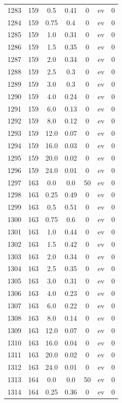 \documentclass[12pt,a4paper]{article}
\begin{document}
\begin{tabular}{r|cccccc}
	1283 & 159 & 0.5 & 0.41 & 0 & ev & 0 \\
	1284 & 159 & 0.75 & 0.4 & 0 & ev & 0 \\
	1285 & 159 & 1.0 & 0.31 & 0 & ev & 0 \\
	1286 & 159 & 1.5 & 0.35 & 0 & ev & 0 \\
	1287 & 159 & 2.0 & 0.34 & 0 & ev & 0 \\
	1288 & 159 & 2.5 & 0.3 & 0 & ev & 0 \\
	1289 & 159 & 3.0 & 0.3 & 0 & ev & 0 \\
	1290 & 159 & 4.0 & 0.24 & 0 & ev & 0 \\
	1291 & 159 & 6.0 & 0.13 & 0 & ev & 0 \\
	1292 & 159 & 8.0 & 0.12 & 0 & ev & 0 \\
	1293 & 159 & 12.0 & 0.07 & 0 & ev & 0 \\
	1294 & 159 & 16.0 & 0.03 & 0 & ev & 0 \\
	1295 & 159 & 20.0 & 0.02 & 0 & ev & 0 \\
	1296 & 159 & 24.0 & 0.01 & 0 & ev & 0 \\
	1297 & 163 & 0.0 & 0.0 & 50 & ev & 0 \\
	1298 & 163 & 0.25 & 0.49 & 0 & ev & 0 \\
	1299 & 163 & 0.5 & 0.51 & 0 & ev & 0 \\
	1300 & 163 & 0.75 & 0.6 & 0 & ev & 0 \\
	1301 & 163 & 1.0 & 0.44 & 0 & ev & 0 \\
	1302 & 163 & 1.5 & 0.42 & 0 & ev & 0 \\
	1303 & 163 & 2.0 & 0.34 & 0 & ev & 0 \\
	1304 & 163 & 2.5 & 0.35 & 0 & ev & 0 \\
	1305 & 163 & 3.0 & 0.31 & 0 & ev & 0 \\
	1306 & 163 & 4.0 & 0.23 & 0 & ev & 0 \\
	1307 & 163 & 6.0 & 0.22 & 0 & ev & 0 \\
	1308 & 163 & 8.0 & 0.14 & 0 & ev & 0 \\
	1309 & 163 & 12.0 & 0.07 & 0 & ev & 0 \\
	1310 & 163 & 16.0 & 0.04 & 0 & ev & 0 \\
	1311 & 163 & 20.0 & 0.02 & 0 & ev & 0 \\
	1312 & 163 & 24.0 & 0.01 & 0 & ev & 0 \\
	1313 & 164 & 0.0 & 0.0 & 50 & ev & 0 \\
	1314 & 164 & 0.25 & 0.36 & 0 & ev & 0 \\

\end{tabular}
\end{document}
